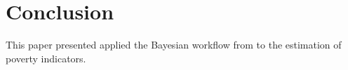 \chapter{Conclusion}

This paper presented applied the Bayesian workflow from \cite{gelman_bayesian_2020} to the estimation of poverty indicators.
